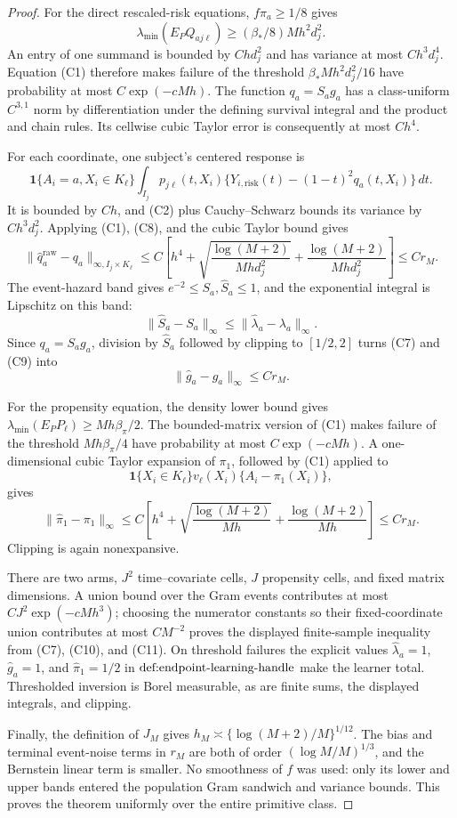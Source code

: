 \documentclass{article}
\begin{document}
\begin{proof}
For the direct rescaled-risk equations, \(f\pi_a\ge1/8\) gives
\[
 \lambda_{\min}(E_PQ_{aj\ell})\ge(\beta_*/8)Mh^2d_j^2.               \tag{C8}
\]
An entry of one summand is bounded by \(Chd_j^2\) and has variance at most \(Ch^3d_j^4\).  Equation (C1) therefore makes failure of the threshold \(\beta_*Mh^2d_j^2/16\) have probability at most \(C\exp(-cMh)\).  The function \(q_a=S_ag_a\) has a class-uniform \(C^{3,1}\) norm by differentiation under the defining survival integral and the product and chain rules.  Its cellwise cubic Taylor error is consequently at most \(Ch^4\).

For each coordinate, one subject's centered response is
\[
 \mathbf 1\{A_i=a,X_i\in K_\ell\}\int_{I_j}p_{j\ell}(t,X_i)
 \{Y_{i,\mathrm{risk}}(t)-(1-t)^2q_a(t,X_i)\}\,dt.
\]
It is bounded by \(Ch\), and (C2) plus Cauchy--Schwarz bounds its variance by \(Ch^3d_j^2\).  Applying (C1), (C8), and the cubic Taylor bound gives
\[
 \lVert\widehat q_a^{\mathrm{raw}}-q_a\rVert_{\infty,I_j\times K_\ell}
 \le C\left[h^4+\sqrt{\frac{\log(M+2)}{Mhd_j^2}}
 +\frac{\log(M+2)}{Mhd_j^2}\right]\le Cr_M.                          \tag{C9}
\]
The event-hazard band gives \(e^{-2}\le S_a,\widehat S_a\le1\), and the exponential integral is Lipschitz on this band:
\[
 \lVert\widehat S_a-S_a\rVert_\infty
 \le\lVert\widehat\lambda_a-\lambda_a\rVert_\infty.
\]
Since \(q_a=S_ag_a\), division by \(\widehat S_a\) followed by clipping to \([1/2,2]\) turns (C7) and (C9) into
\[
 \lVert\widehat g_a-g_a\rVert_\infty\le Cr_M.                        \tag{C10}
\]

For the propensity equation, the density lower bound gives \(\lambda_{\min}(E_PP_\ell)\ge Mh\beta_\pi/2\).  The bounded-matrix version of (C1) makes failure of the threshold \(Mh\beta_\pi/4\) have probability at most \(C\exp(-cMh)\).  A one-dimensional cubic Taylor expansion of \(\pi_1\), followed by (C1) applied to
\[
 \mathbf 1\{X_i\in K_\ell\}v_\ell(X_i)\{A_i-\pi_1(X_i)\},
\]
gives
\[
 \lVert\widehat\pi_1-\pi_1\rVert_\infty
 \le C\left[h^4+\sqrt{\frac{\log(M+2)}{Mh}}
 +\frac{\log(M+2)}{Mh}\right]\le Cr_M.                              \tag{C11}
\]
Clipping is again nonexpansive.

There are two arms, \(J^2\) time--covariate cells, \(J\) propensity cells, and fixed matrix dimensions.  A union bound over the Gram events contributes at most \(CJ^2\exp(-cMh^3)\); choosing the numerator constants so their fixed-coordinate union contributes at most \(CM^{-2}\) proves the displayed finite-sample inequality from (C7), (C10), and (C11).  On threshold failures the explicit values \(\widehat\lambda_a=1\), \(\widehat g_a=1\), and \(\widehat\pi_1=1/2\) in \(\textnormal{def:endpoint-learning-handle}\) make the learner total.  Thresholded inversion is Borel measurable, as are finite sums, the displayed integrals, and clipping.

Finally, the definition of \(J_M\) gives \(h_M\asymp\{\log(M+2)/M\}^{1/12}\).  The bias and terminal event-noise terms in \(r_M\) are both of order \((\log M/M)^{1/3}\), and the Bernstein linear term is smaller.  No smoothness of \(f\) was used: only its lower and upper bands entered the population Gram sandwich and variance bounds.  This proves the theorem uniformly over the entire primitive class.
\end{proof}
\end{document}
